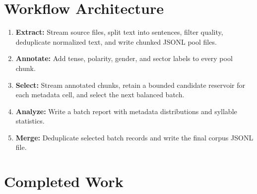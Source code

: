 \documentclass[11pt,a4paper]{article}
\begin{document}
\section{Workflow Architecture}
\begin{enumerate}[leftmargin=1.7em]
\item \textbf{Extract:} Stream source files, split text into sentences, filter quality, deduplicate normalized text, and write chunked JSONL pool files.
\item \textbf{Annotate:} Add tense, polarity, gender, and sector labels to every pool chunk.
\item \textbf{Select:} Stream annotated chunks, retain a bounded candidate reservoir for each metadata cell, and select the next balanced batch.
\item \textbf{Analyze:} Write a batch report with metadata distributions and syllable statistics.
\item \textbf{Merge:} Deduplicate selected batch records and write the final corpus JSONL file.
\end{enumerate}
\section{Completed Work}
\end{document}
